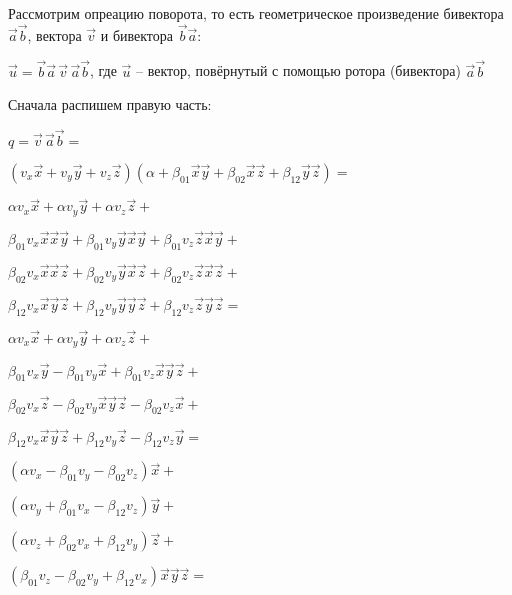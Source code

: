 \documentclass{article} %
\begin{document}
{\Large

\noindent
Рассмотрим опреацию поворота, то есть геометрическое произведение бивектора $\vec{a}\vec{b}$, вектора $\vec{v}$ и бивектора $\vec{b}\vec{a}$:

\hfill

$\vec{u} = \vec{b}\vec{a}\, \vec{v}\, \vec{a}\vec{b}$, где $\vec{u}$ -- вектор, повёрнутый с помощью ротора (бивектора) $\vec{a}\vec{b}$

\hfill

\noindent
Сначала распишем правую часть:

\hfill

$q = \vec{v}\, \vec{a}\vec{b} =$

$(v_x \vec{x} + v_y \vec{y} +  v_z \vec{z}) (\alpha + \beta_{01} \vec{x} \vec{y} + \beta_{02}\vec{x} \vec{z} + \beta_{12} \vec{y} \vec{z}) = $

\hfill

$\alpha v_x \vec{x} + \alpha v_y \vec{y} + \alpha v_z \vec{z} +$

$\beta_{01} v_x \vec{x}\vec{x}\vec{y} + \beta_{01} v_y \vec{y}\vec{x}\vec{y} + \beta_{01} v_z \vec{z}\vec{x}\vec{y} +$

$\beta_{02} v_x \vec{x}\vec{x}\vec{z} + \beta_{02} v_y \vec{y}\vec{x}\vec{z} + \beta_{02} v_z \vec{z}\vec{x}\vec{z} +$

$\beta_{12} v_x \vec{x}\vec{y}\vec{z} + \beta_{12} v_y \vec{y}\vec{y}\vec{z} + \beta_{12} v_z \vec{z}\vec{y}\vec{z} =$

\hfill

$\alpha v_x \vec{x} + \alpha v_y \vec{y} + \alpha v_z \vec{z} +$

$\beta_{01} v_x \vec{y} - \beta_{01} v_y \vec{x} + \beta_{01} v_z \vec{x}\vec{y}\vec{z} +$

$\beta_{02} v_x \vec{z} - \beta_{02} v_y \vec{x}\vec{y}\vec{z} - \beta_{02} v_z \vec{x} +$

$\beta_{12} v_x \vec{x}\vec{y}\vec{z} + \beta_{12} v_y \vec{z} - \beta_{12} v_z \vec{y} =$

\hfill

$(\alpha v_x - \beta_{01} v_y - \beta_{02} v_z)\vec{x} +$

$(\alpha v_y + \beta_{01} v_x - \beta_{12} v_z) \vec{y} +$

$(\alpha v_z + \beta_{02} v_x + \beta_{12} v_y) \vec{z} +$

$(\beta_{01} v_z - \beta_{02} v_y + \beta_{12} v_x) \vec{x}\vec{y}\vec{z} = $

\hfill

}
\end{document}
